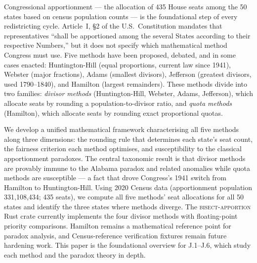 Congressional apportionment --- the allocation of 435 House seats among the
50 states based on census population counts --- is the foundational step
of every redistricting cycle.
Article~I, \S2 of the U.S.\ Constitution mandates that representatives
``shall be apportioned among the several States according to their
respective Numbers,'' but it does not specify which mathematical method
Congress must use.
Five methods have been proposed, debated, and in some cases enacted:
Huntington-Hill (equal proportions, current law since 1941),
Webster (major fractions), Adams (smallest divisors),
Jefferson (greatest divisors, used 1790--1840), and Hamilton
(largest remainders).
These methods divide into two families: \emph{divisor methods}
(Huntington-Hill, Webster, Adams, Jefferson), which allocate seats by
rounding a population-to-divisor ratio, and \emph{quota methods}
(Hamilton), which allocate seats by rounding exact proportional quotas.

We develop a unified mathematical framework characterising all five methods
along three dimensions: the rounding rule that determines each state's
seat count, the fairness criterion each method optimises, and susceptibility
to the classical apportionment paradoxes.
The central taxonomic result is that divisor methods are provably
immune to the Alabama paradox and related anomalies while quota methods
are susceptible --- a fact that drove Congress's 1941 switch from Hamilton
to Huntington-Hill.
Using 2020 Census data (apportionment population 331{,}108{,}434;
435 seats), we compute all five methods' seat allocations for all 50 states
and identify the three states where methods diverge.
The \textsc{bisect-apportion} Rust crate currently implements the four divisor
methods with floating-point priority comparisons.  Hamilton remains a
mathematical reference point for paradox analysis, and Census-reference
verification fixtures remain future hardening work.
This paper is the foundational overview for J.1--J.6, which study each
method and the paradox theory in depth.
